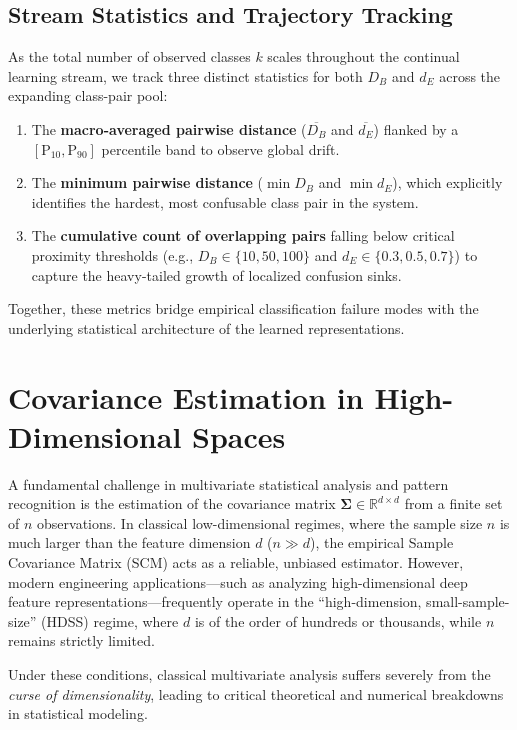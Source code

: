 \subsection{Stream Statistics and Trajectory Tracking}
\label{sec:method:separability:tracking}

As the total number of observed classes $k$ scales throughout the continual learning stream, we track three distinct statistics for both $D_B$ and $d_E$ across the expanding class-pair pool:
\begin{enumerate}
	\item[(a)] The \textbf{macro-averaged pairwise distance} ($\overline{D_B}$ and $\overline{d_E}$) flanked by a $[\mathrm{P}_{10},\mathrm{P}_{90}]$ percentile band to observe global drift.
	\item[(b)] The \textbf{minimum pairwise distance} ($\min D_B$ and $\min d_E$), which explicitly identifies the hardest, most confusable class pair in the system.
	\item[(c)] The \textbf{cumulative count of overlapping pairs} falling below critical proximity thresholds (e.g., $D_B \in \{10, 50, 100\}$ and $d_E \in \{0.3, 0.5, 0.7\}$) to capture the heavy-tailed growth of localized confusion sinks.
\end{enumerate}
Together, these metrics bridge empirical classification failure modes with the underlying statistical architecture of the learned representations.

\section{Covariance Estimation in High-Dimensional Spaces}
\label{sec:gsc:covariance}

A fundamental challenge in multivariate statistical analysis and pattern recognition is the estimation of the covariance matrix $\boldsymbol{\Sigma} \in \mathbb{R}^{d \times d}$ from a finite set of $n$ observations. In classical low-dimensional regimes, where the sample size $n$ is much larger than the feature dimension $d$ ($n \gg d$), the empirical Sample Covariance Matrix (SCM) acts as a reliable, unbiased estimator. However, modern engineering applications—such as analyzing high-dimensional deep feature representations—frequently operate in the ``high-dimension, small-sample-size'' (HDSS) regime, where $d$ is of the order of hundreds or thousands, while $n$ remains strictly limited.

Under these conditions, classical multivariate analysis suffers severely from the \textit{curse of dimensionality}, leading to critical theoretical and numerical breakdowns in statistical modeling.

